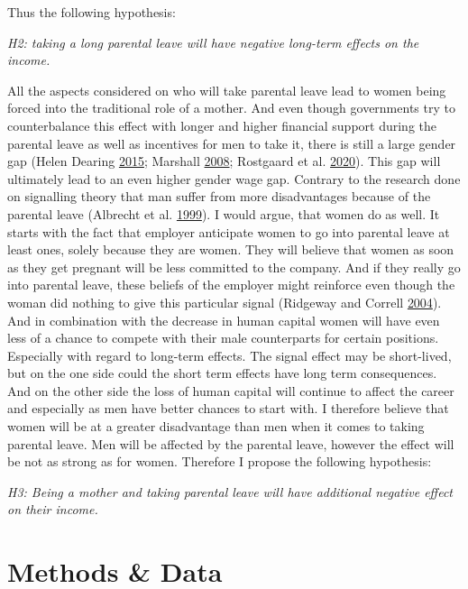 \documentclass[
  12pt,
]{article}
\begin{document}
Thus the following hypothesis:

\emph{H2: taking a long parental leave will have negative long-term effects on the income.}

All the aspects considered on who will take parental leave lead to women being forced into the traditional role of a mother.
And even though governments try to counterbalance this effect with longer and higher financial support during the parental leave as well as incentives for men to take it, there is still a large gender gap (Helen Dearing \protect\hyperlink{ref-helen_dearing_does_2015}{2015}; Marshall \protect\hyperlink{ref-marshall_fathers_2008}{2008}; Rostgaard et al. \protect\hyperlink{ref-rostgaard_parental_2020}{2020}).
This gap will ultimately lead to an even higher gender wage gap.
Contrary to the research done on signalling theory that man suffer from more disadvantages because of the parental leave (Albrecht et al. \protect\hyperlink{ref-albrecht_career_1999}{1999}). I would argue, that women do as well. It starts with the fact that employer anticipate women to go into parental leave at least ones, solely because they are women. They will believe that women as soon as they get pregnant will be less committed to the company. And if they really go into parental leave, these beliefs of the employer might reinforce even though the woman did nothing to give this particular signal (Ridgeway and Correll \protect\hyperlink{ref-ridgeway_unpacking_2004}{2004}). And in combination with the decrease in human capital women will have even less of a chance to compete with their male counterparts for certain positions. Especially with regard to long-term effects. The signal effect may be short-lived, but on the one side could the short term effects have long term consequences. And on the other side the loss of human capital will continue to affect the career and especially as men have better chances to start with. I therefore believe that women will be at a greater disadvantage than men when it comes to taking parental leave. Men will be affected by the parental leave, however the effect will be not as strong as for women.
Therefore I propose the following hypothesis:

\emph{H3: Being a mother and taking parental leave will have additional negative effect on their income.}

\hypertarget{methods-data}{%
\section{Methods \& Data}\label{methods-data}}
\end{document}
